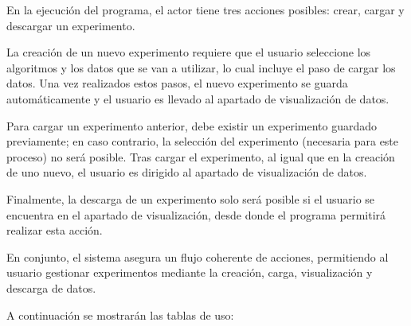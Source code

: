 En la ejecución del programa, el actor tiene tres acciones posibles: crear, cargar y descargar un experimento.

La creación de un nuevo experimento requiere que el usuario seleccione los algoritmos y los datos que se van a utilizar, lo cual incluye el paso de cargar los datos. Una vez realizados estos pasos, el nuevo experimento se guarda automáticamente y el usuario es llevado al apartado de visualización de datos.

Para cargar un experimento anterior, debe existir un experimento guardado previamente; en caso contrario, la selección del experimento (necesaria para este proceso) no será posible. Tras cargar el experimento, al igual que en la creación de uno nuevo, el usuario es dirigido al apartado de visualización de datos.

Finalmente, la descarga de un experimento solo será posible si el usuario se encuentra en el apartado de visualización, desde donde el programa permitirá realizar esta acción.

En conjunto, el sistema asegura un flujo coherente de acciones, permitiendo al usuario gestionar experimentos mediante la creación, carga, visualización y descarga de datos.

A continuación se mostrarán las tablas de uso:

